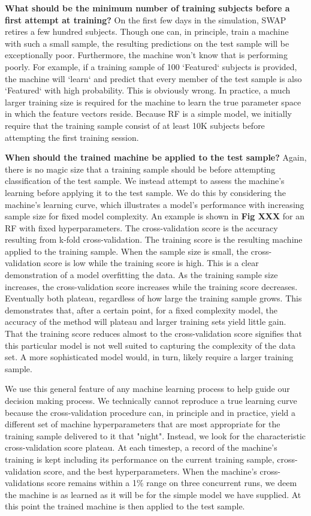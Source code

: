 \documentclass[twocolumn]{aastex6}
\begin{document}
\textbf{What should be the minimum number of training subjects before a first attempt at training?}
On the first few days in the simulation, SWAP retires a few hundred subjects.
Though one can, in principle, train a machine with such a small sample, the resulting
predictions on the test sample will be exceptionally poor. Furthermore, the machine
won't know that is performing poorly. For example, if a training sample of 100 `Featured`
subjects is provided, the machine will `learn` and predict that every member of the 
test sample is also `Featured` with high probability. This is obviously wrong. 
In practice, a much larger training size is required for the machine to learn the 
true parameter space in which the feature vectors reside. Because RF is a simple
model, we initially require that the training sample consist of at least 10K subjects
before attempting the first training session. 

\textbf{When should the trained machine be applied to the test sample?} Again, there is
no magic size that a training sample should be before attempting classification
of the test sample. We instead attempt to assess the machine's learning
before applying it to the test sample. We do this by considering the machine's
learning curve, which illustrates a model's performance with 
increasing sample size for fixed model complexity. An example is shown in \textbf{Fig XXX}
for an RF with fixed hyperparameters. The cross-validation score is the accuracy
resulting from k-fold cross-validation. The training score is the resulting machine
applied to the training sample. When the sample size is small, the cross-validation
score is low while the training score is high. This is a clear demonstration of a model
overfitting the data. As the training sample size 
increases, the cross-validation score increases while the training score decreases. 
Eventually both plateau, regardless of how large the training sample grows. This 
demonstrates that, after a certain point, for a fixed complexity model, the accuracy
of the method will plateau and larger training sets yield little gain. That the training
score reduces almost to the cross-validation score signifies that this particular
model is not well suited to capturing the complexity of the data set. 
A more sophisticated model would, in turn, likely require a larger training
sample. 

We use this general feature of any machine learning process to help guide our 
decision making process. We technically cannot reproduce a true learning curve
because the cross-validation procedure can, in principle and in practice, yield a
different set of machine hyperparameters that are most appropriate for the training
sample delivered to it that "night".  Instead, we look for the characteristic 
cross-validation score plateau. At each timestep, a record of the machine's 
training is kept including its performance on the current training sample, 
cross-validation score, and the best hyperparameters. When the machine's 
cross-validations score remains within a 1\% range on three concurrent runs, 
we deem the machine is as learned as it will be for the simple model we have 
supplied. At this point the trained machine is then applied to the test sample. 
\end{document}
